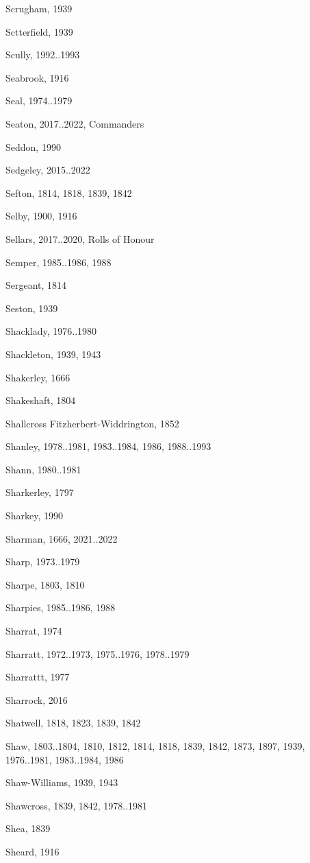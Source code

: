 \begin{theindex}
\item Scrugham, 1939
\item Sctterfield, 1939
\item Scully, 1992..1993
\item Seabrook, 1916
\item Seal, 1974..1979
\item Seaton, 2017..2022, Commanders
\item Seddon, 1990
\item Sedgeley, 2015..2022
\item Sefton, 1814, 1818, 1839, 1842
\item Selby, 1900, 1916
\item Sellars, 2017..2020, Rolls of Honour
\item Semper, 1985..1986, 1988
\item Sergeant, 1814
\item Seston, 1939
\item Shacklady, 1976..1980
\item Shackleton, 1939, 1943
\item Shakerley, 1666
\item Shakeshaft, 1804
\item Shallcross Fitzherbert-Widdrington, 1852
\item Shanley, 1978..1981, 1983..1984, 1986, 1988..1993
\item Shann, 1980..1981
\item Sharkerley, 1797
\item Sharkey, 1990
\item Sharman, 1666, 2021..2022
\item Sharp, 1973..1979
\item Sharpe, 1803, 1810
\item Sharpies, 1985..1986, 1988
\item Sharrat, 1974
\item Sharratt, 1972..1973, 1975..1976, 1978..1979
\item Sharrattt, 1977
\item Sharrock, 2016
\item Shatwell, 1818, 1823, 1839, 1842
\item Shaw, 1803..1804, 1810, 1812, 1814, 1818, 1839, 1842, 1873, 1897, 1939, 1976..1981, 1983..1984, 1986
\item Shaw-Williams, 1939, 1943
\item Shawcross, 1839, 1842, 1978..1981
\item Shea, 1839
\item Sheard, 1916

\end{theindex}
